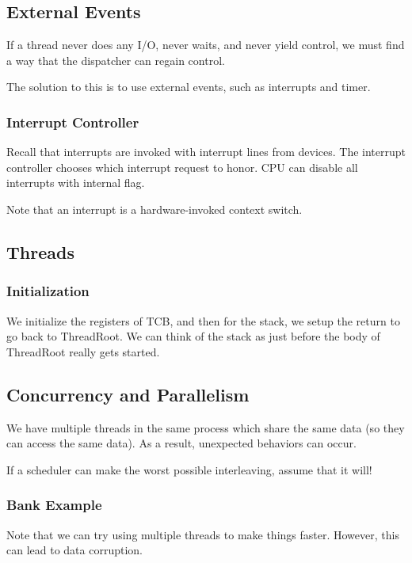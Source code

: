 \documentclass[openany]{book}
\begin{document}
\subsection{External Events}
If a thread never does any I/O, never waits, and never yield control, we must find a way that the dispatcher can regain control.

The solution to this is to use external events, such as interrupts and timer.

\subsubsection{Interrupt Controller}
Recall that interrupts are invoked with interrupt lines from devices. The interrupt controller chooses which interrupt request to honor. CPU can disable all interrupts with internal flag.


Note that an interrupt is a hardware-invoked context switch.

\subsection{Threads}
\subsubsection{Initialization}
We initialize the registers of TCB, and then for the stack, we setup the return to go back to ThreadRoot. We can think of the stack as just before the body of ThreadRoot really gets started.

\subsection{Concurrency and Parallelism}
We have multiple threads in the same process which share the same data (so they can access the same data). As a result, unexpected behaviors can occur.

\begin{warn}
	If a scheduler can make the worst possible interleaving, assume that it will!
\end{warn}

\subsubsection{Bank Example}
Note that we can try using multiple threads to make things faster. However, this can lead to data corruption.
\end{document}
